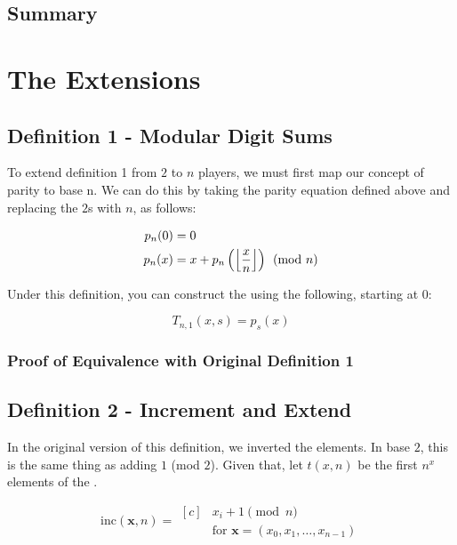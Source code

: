 \documentclass[conference]{IEEEtran}
\begin{document}
\subsection{Summary}

\section{The Extensions}

\subsection{Definition 1 - Modular Digit Sums}

To extend definition 1 from $2$ to $n$ players, we must first map our concept of parity to base n. We can do this by taking the parity equation defined above and replacing the $2$s with $n$, as follows:

\begin{equation}
    \begin{aligned}
        p_n(0) &= 0 \\
        p_n(x) &= x + p_n\left(\left\lfloor \dfrac{x}{n} \right\rfloor\right) \pmod{n}
    \end{aligned}
\end{equation}

Under this definition, you can construct the \TMS using the following, starting at 0:

\begin{equation}
    T_{n,1}(x, s) = p_s(x)
\end{equation}

\subsubsection{Proof of Equivalence with Original Definition 1}

\subsection{Definition 2 - Increment and Extend}

In the original version of this definition, we inverted the elements. In base $2$, this is the same thing as adding $1$ (mod $2$). Given that, let $t(x, n)$ be the first $n^x$ elements of the \ETMS.

\begin{equation}
    \text{inc}(\mathbf{x}, n) = \begin{aligned}[c]
            &x_i + 1 \pmod{n} \\
            &\text{for } \mathbf{x} = (x_0, x_1, \ldots, x_{n-1})
    \end{aligned}
\end{equation}
\end{document}
